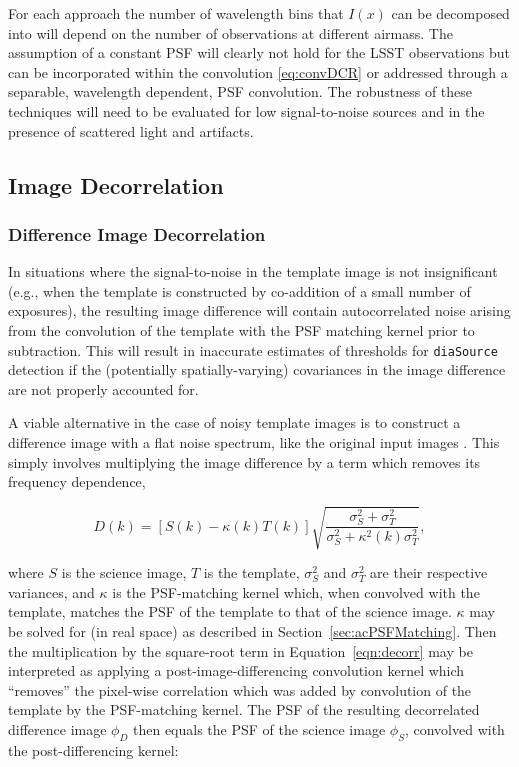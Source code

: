 For each approach the number of wavelength bins that $I(x)$ can be decomposed into will depend on the number of observations at different airmass. The assumption of a constant PSF will clearly not hold for the LSST observations but can be incorporated within the convolution \autoref{eq:convDCR} or addressed through a separable, wavelength dependent, PSF convolution. The robustness of these techniques will need to be evaluated for low signal-to-noise sources and in the presence of scattered light and artifacts. 

\subsection{Image Decorrelation}
\label{sec:acImageDecorrelation}
\subsubsection{Difference Image Decorrelation}
\label{sec:acDiffImDecorrelation}

In situations where the signal-to-noise in the template image is not insignificant (e.g., when the template is constructed by co-addition of a small number of exposures), the resulting image difference will contain autocorrelated noise arising from the convolution of the template with the PSF matching kernel prior to subtraction. This will result in inaccurate estimates of thresholds for {\tt diaSource} detection if the (potentially spatially-varying) covariances in the image difference are not properly accounted for.

A viable alternative in the case of noisy template images is to construct a difference image with a flat noise spectrum, like the original input images \citep{Kaiser04, Zackay16}. This simply involves multiplying the image difference by a term which removes its frequency dependence,

\begin{equation}
  D(k) = \left[S(k) - \kappa(k) T(k)\right]\sqrt{\frac{\sigma_S^2+\sigma_T^2}{\sigma_S^2 + \kappa^2(k)\sigma_T^2}},
  \label{eqn:decorr}
\end{equation}

\noindent
where $S$ is the science image, $T$ is the template, $\sigma_S^2$ and $\sigma_T^2$ are their respective variances, and $\kappa$ is the PSF-matching kernel which, when convolved with the template, matches the PSF of the template to that of the science image. $\kappa$ may be solved for (in real space) as described in Section~\ref{sec:acPSFMatching}. Then the multiplication by the square-root term in Equation~\ref{eqn:decorr} may be interpreted as applying a post-image-differencing convolution kernel which ``removes'' the pixel-wise correlation which was added by convolution of the template by the PSF-matching kernel. The PSF of the resulting decorrelated difference image $\phi_D$ then equals the PSF of the science image $\phi_S$, convolved with the post-differencing kernel:

